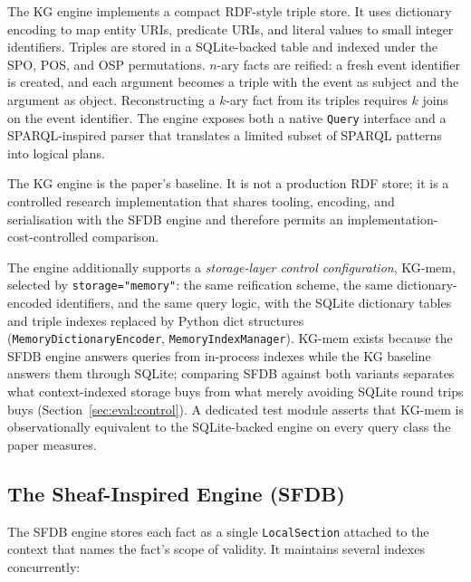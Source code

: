 The KG engine implements a compact RDF-style triple store. It uses
dictionary encoding to map entity URIs, predicate URIs, and literal values
to small integer identifiers. Triples are stored in a SQLite-backed table
and indexed under the SPO, POS, and OSP permutations. $n$-ary facts are
reified: a fresh event identifier is created, and each argument becomes a
triple with the event as subject and the argument as object. Reconstructing a
$k$-ary fact from its triples requires $k$ joins on the event identifier.
The engine exposes both a native \texttt{Query} interface and a
SPARQL-inspired parser that translates a limited subset of SPARQL patterns
into logical plans.

The KG engine is the paper's baseline. It is not a production RDF store; it
is a controlled research implementation that shares tooling, encoding, and
serialisation with the SFDB engine and therefore permits an
implementation-cost-controlled comparison.

The engine additionally supports a \emph{storage-layer control
configuration}, KG-mem, selected by \texttt{storage="memory"}: the same
reification scheme, the same dictionary-encoded identifiers, and the
same query logic, with the SQLite dictionary tables and triple indexes
replaced by Python dict structures
(\texttt{MemoryDictionaryEncoder}, \texttt{MemoryIndexManager}). KG-mem
exists because the SFDB engine answers queries from in-process indexes
while the KG baseline answers them through SQLite; comparing SFDB
against both variants separates what context-indexed storage buys from
what merely avoiding SQLite round trips buys
(Section~\ref{sec:eval:control}). A dedicated test module asserts that
KG-mem is observationally equivalent to the SQLite-backed engine on
every query class the paper measures.

\subsection{The Sheaf-Inspired Engine (SFDB)}
\label{sec:arch:sheaf}

The SFDB engine stores each fact as a single \texttt{LocalSection} attached
to the context that names the fact's scope of validity. It maintains
several indexes concurrently:

